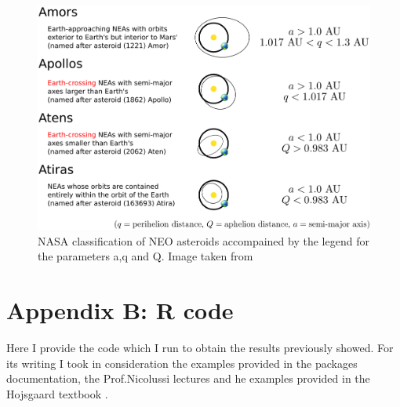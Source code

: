 \documentclass[12pt,%
               a4paper,%
               oneside,openany,%
               titlepage,%
               headinclude,footinclude,%
               BCOR5mm,%
               cleardoublepage=empty,%
               tablecaptionabove,%
               floatperchapter,
               ]{scrreprt}                 %
\begin{document}
\begin{figure}[h]
\begin{center}
\includegraphics[width=1\textwidth]{Figures/neo_orbit_types.jpg}
\caption{NASA classification of NEO asteroids accompained by the legend for the parameters a,q and Q. Image taken from \cite{nasa_classification}}
\label{neo_orbit_types}
\end{center}
\end{figure}

\chapter{Appendix B: R code} Here I provide the code which I run to obtain the results previously showed.  For its writing I took in consideration the examples provided in the  packages documentation, the Prof.Nicolussi lectures and he examples provided in the Hojsgaard textbook  \cite{hojsgaard2012graphical}. 






\newpage



\end{document}
